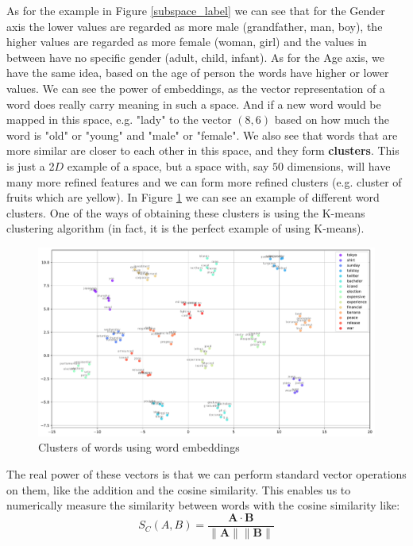 \documentclass[12pt]{article}
\numberwithin{equation}{section}
\begin{document}
\begin{spacing}{1.5}
	As for the example in Figure \ref{subspace_label} we can see that for the Gender axis the lower values are regarded as more male (grandfather, man, boy), the higher values are regarded as more female (woman, girl) and the values in between have no specific gender (adult, child, infant). As for the Age axis, we have the same idea, based on the age of person the words have higher or lower values. We can see the power of embeddings, as the vector representation of a word does really carry meaning in such a space. And if a new word would be mapped in this space, e.g. "lady" to the vector $(8, 6)$ based on how much the word is "old" or "young" and "male" or "female". We also see that words that are more similar are closer to each other in this space, and they form \textbf{clusters}. This is just a 2$D$ example of a space, but a space with, say $50$ dimensions, will have many more refined features and we can form more refined clusters (e.g. cluster of fruits which are yellow). In Figure \ref{cluster} we can see an example of different word clusters. One of the ways of obtaining these clusters is using the K-means clustering algorithm (in fact, it is the perfect example of using K-means). 
	\begin{figure}[H]
		\centering

		\includegraphics[scale=0.50]{clusters}		
		\caption{Clusters of words using word embeddings}
		\label{cluster}
	\end{figure}
	
	The real power of these vectors is that we can perform standard vector operations on them, like the addition and the cosine similarity. This enables us to numerically measure the similarity between words with the cosine similarity like:
	\begin{equation}\label{cosine_similarity}
		S_C(A, B) = \frac{\mathbf{A}\cdot \mathbf{B}}{\|\mathbf{A}\| \| \mathbf{B}\|}
	\end{equation}


\end{spacing}
\end{document}
